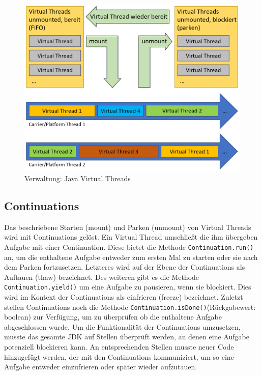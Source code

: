 \documentclass[fontsize=12pt,paper=a4,twoside=semi,parskip=half-,headsepline,headinclude]{scrreprt}
\newcommand{\code}[1]{\texttt{#1}}
\begin{document}
\begin{figure}[h]
	\centering
	\includegraphics[scale=0.5]{figures/VirtualThreadsAblauf.png}
	\caption{Verwaltung: Java Virtual Threads}
	\label{fig:VirtualThreadsAblauf}
\end{figure}

\subsection{Continuations}

Das beschriebene Starten (mount) und Parken (unmount) von Virtual Threads wird mit Continuations gelöst. Ein Virtual Thread umschließt die ihm übergeben Aufgabe mit einer Continuation. Diese bietet die Methode \code{Continuation.run()} an, um die enthaltene Aufgabe entweder zum ersten Mal zu starten oder sie nach dem Parken fortzusetzen. Letzteres wird auf der Ebene der Continuations als Auftauen (thaw) bezeichnet. Des weiteren gibt es die Methode \code{Continuation.yield()} um eine Aufgabe zu pausieren, wenn sie blockiert. Dies wird im Kontext der Continuations als einfrieren (freeze) bezeichnet. Zuletzt stellen Continuations noch die Methode \code{Continuation.isDone()}(Rückgabewert: boolean) zur Verfügung, um zu überprüfen ob die enthaltene Aufgabe abgeschlossen wurde. Um die Funktionalität der Continuations umzusetzen, musste das gesamte JDK auf Stellen überprüft werden, an denen eine Aufgabe potenziell blockieren kann. An entsprechenden Stellen musste neuer Code hinzugefügt werden, der mit den Continuations kommuniziert, um so eine Aufgabe entweder einzufrieren oder später wieder aufzutauen.\cite{Pressler2023b}
\end{document}
